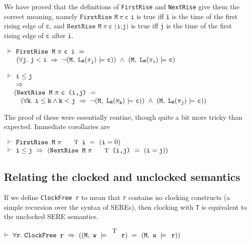 \documentclass{llncs}
\newcommand{\T}{\texttt{\small\rm{T}}}
\newcommand{\bSem}[3]{(\tt#1,~#2~{\models}~#3)}
\newcommand{\sSem}[4]{(\tt{#1,~#2~\models^{\hspace*{-2.3mm}\raisebox{1mm}{\tt#3}}~#4})}
\renewcommand{\c}{{\hspace*{2.5mm}}}
\renewcommand{\t}[1]{\texttt{#1}}
\begin{document}
We have proved that the definitions of \t{FirstRise} and \t{NextRise} give them the correct meaning,
namely $\t{FirstRise~M}~{\pi}~\t{c~i}$ is true iff \t{i} is the time of the first
rising edge of \t{c},
and $\t{NextRise~M}~{\pi}~\t{c~(i,j)}$ is true iff \t{j} is the time of the first
rising edge of \t{c} after \t{i}.

\medskip

$\begin{array}{l}
\vdash~ \t{FirstRise~M}~{\pi}~\t{c~i}~=\\
\phantom{\vdash~}
~(\forall \t{j}.~\t{j} < \t{i} ~\Rightarrow~\neg\bSem{M}{L_{M}(\pi_j)}{\t{c}})~\wedge~\bSem{M}{L_{M}(\pi_i)}{\t{c}}\\
 \\
\vdash~ \t{i}\leq \t{j}\\
\phantom{\vdash~}
\Rightarrow\\
\phantom{\vdash~}
(\t{NextRise~M}~{\pi}~\t{c~(i,j)}~=\\
\phantom{\vdash~(}
~(\forall \t{k}.~\t{i} \leq \t{k} \wedge \t{k} < \t{j} ~\Rightarrow~\neg\bSem{M}{L_{M}(\pi_k)}{\t{c}})~\wedge~\bSem{M}{L_{M}(\pi_j)}{\t{c}})
\end{array}$

\medskip

The proof of these were essentially routine, though quite a bit more tricky than expected. Immediate corollaries are


\medskip

$\begin{array}{l}
\vdash~ \t{FirstRise~M}~{\pi}~\t{\T~i}~=~(\t{i}=0)
 \\
\vdash~ \t{i}\leq \t{j}~\Rightarrow~(\t{NextRise~M}~{\pi}~\t{\T~(i,j)}~=~(\t{i} = \t{j}))
\end{array}$

\subsection{Relating the clocked and unclocked semantics}\label{relatingclocks}

If we define \t{ClockFree~r} to mean
that \t{r} contains no clocking constructs (a simple recursion over the syntax of SEREs),
then clocking with \T{} is equivalent to the unclocked SERE semantics.

\medskip

$\vdash~\forall{\t{r}}.~\t{ClockFree~r}~\Rightarrow~(\sSem{M}{w}{\T}{r}~=~\sSem{M}{w}{\c}{r})$

\medskip
\end{document}
